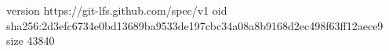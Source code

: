 version https://git-lfs.github.com/spec/v1
oid sha256:2d3efc6734e0bd13689ba9533de197cbc34a08a8b9168d2ec498f63ff12aece9
size 43840
